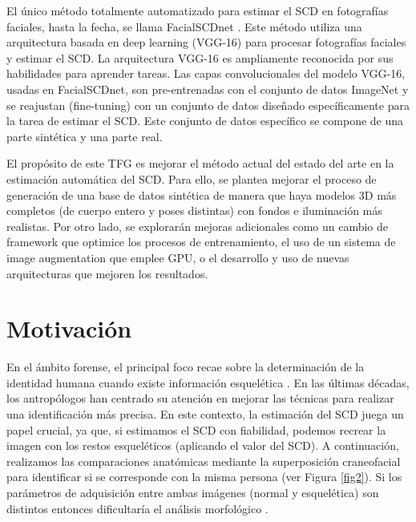 El único método totalmente automatizado para estimar el SCD en fotografías faciales, hasta la fecha, se llama FacialSCDnet \cite{14}. Este método utiliza una arquitectura basada en deep learning (VGG-16) para procesar fotografías faciales y estimar el SCD. La arquitectura VGG-16 es ampliamente reconocida por sus habilidades para aprender tareas. Las capas convolucionales del modelo VGG-16, usadas en FacialSCDnet, son pre-entrenadas con el conjunto de datos ImageNet y se reajustan (fine-tuning) con un conjunto de datos diseñado específicamente para la tarea de estimar el SCD. Este conjunto de datos específico se compone de una parte sintética y una parte real.

El propósito de este TFG es mejorar el método actual del estado del arte en la estimación automática del SCD. Para ello, se plantea mejorar el proceso de generación de una base de datos sintética de manera que haya modelos 3D más completos (de cuerpo entero y poses distintas) con fondos e iluminación más realistas.
Por otro lado, se explorarán mejoras adicionales como un cambio de framework que optimice los procesos de entrenamiento, el uso de un sistema de image augmentation que emplee GPU, o el desarrollo y uso de nuevas arquitecturas que mejoren los resultados.


\section{Motivación}
En el ámbito forense, el principal foco recae sobre la determinación de la identidad humana cuando existe información esquelética \cite{22}. En las últimas décadas, los antropólogos han centrado su atención en mejorar las técnicas para realizar una identificación más precisa. En este contexto, la estimación del SCD juega un papel crucial, ya que, si estimamos el SCD con fiabilidad, podemos recrear la imagen con los restos esqueléticos (aplicando el valor del SCD). A continuación, realizamos las comparaciones anatómicas mediante la superposición craneofacial \cite{21} para identificar si se corresponde con la misma persona (ver Figura \ref{fig2}). Si los parámetros de adquisición entre ambas imágenes (normal y esquelética) son distintos entonces dificultaría el análisis morfológico \cite{23}.


